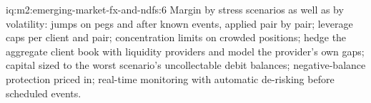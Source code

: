 \begin{solution}{iq:m2:emerging-market-fx-and-ndfs:6}
Margin by stress scenarios as well as by volatility: jumps on pegs and after
known events, applied pair by pair; leverage caps per client and pair;
concentration limits on crowded positions; hedge the aggregate client book
with liquidity providers and model the provider's own gaps; capital sized to
the worst scenario's uncollectable debit balances; negative-balance protection
priced in; real-time monitoring with automatic de-risking before scheduled
events.
\end{solution}
